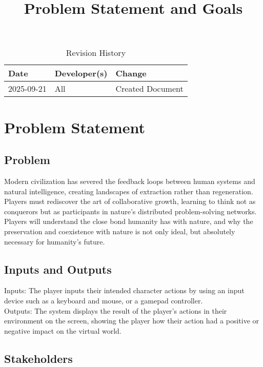\documentclass{article}
\title{Problem Statement and Goals\\\progname}
\author{\authname}
\date{}
\begin{document}
\maketitle

\begin{table}[hp]
\caption{Revision History} \label{TblRevisionHistory}
\begin{tabularx}{\textwidth}{llX}
\toprule
\textbf{Date} & \textbf{Developer(s)} & \textbf{Change}\\
\midrule
2025-09-21 & All & Created Document\\
\bottomrule
\end{tabularx}
\end{table}

\newpage{}

\tableofcontents

\section{Problem Statement}

\subsection{Problem}

Modern civilization has severed the feedback loops between human systems and natural intelligence, creating landscapes of extraction rather than regeneration. Players must rediscover the art of collaborative growth, learning to think not as conquerors but as participants in nature's distributed problem-solving networks. Players will understand the close bond humanity has with nature, and why the preservation and coexistence with nature is not only ideal, but absolutely necessary for humanity's future.

\subsection{Inputs and Outputs}

Inputs: The player inputs their intended character actions by using an input device such as a keyboard and mouse, or a gamepad controller.\\
Outputs: The system displays the result of the player’s actions in their environment on the screen, showing the player how their action had a positive or negative impact on the virtual world.

\subsection{Stakeholders}
\end{document}
